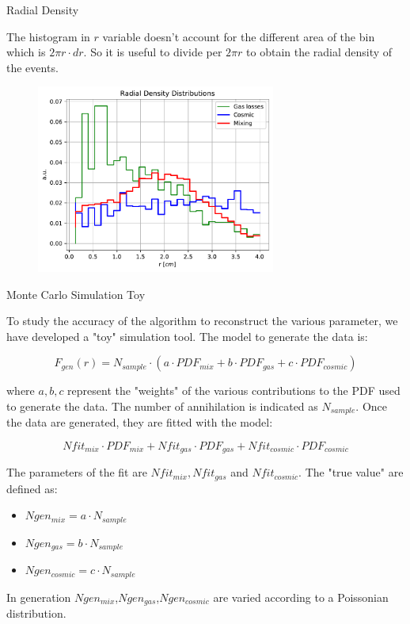 \documentclass[9pt]{beamer}
\newcommand{\disappear}[1]{} %
\begin{document}
\begin{frame}{Radial Density}

The histogram in $r$ variable doesn't account for the different area of the bin which is $2 \pi r \cdot dr$. So it is useful to divide per $2 \pi r$ to obtain the radial density of the events.

\begin{figure}[hbtp]
\centering
\includegraphics[width = 0.7\textwidth]{RadialDensity.pdf}
\disappear{\caption{Radial density for \texttt{r68465\_uw\_exp\_freq4.vertex} dataset}}
\end{figure}
\end{frame}

\begin{frame}[t]{Monte Carlo Simulation Toy}

To study the accuracy of the algorithm to reconstruct the various parameter, we have developed a "toy" simulation tool. The model to generate the data is:

\begin{equation}
F_{gen}(r) = N_{sample} \cdot (a \cdot PDF_{mix} + b \cdot PDF_{gas} + c \cdot PDF_{cosmic}) 
\end{equation}

where $a,b,c$ represent the "weights" of the various contributions to the PDF used to generate the data. The number of annihilation is indicated as $N_{sample}$. Once the data are generated, they are fitted with the model:

\begin{equation}
Nfit_{mix} \cdot PDF_{mix} + Nfit_{gas} \cdot PDF_{gas} + Nfit_{cosmic} \cdot PDF_{cosmic}
\end{equation}

The parameters of the fit are $Nfit_{mix}, Nfit_{gas}$ and $Nfit_{cosmic}$. The "true value" are defined as:

\begin{itemize}
\centering
\item $Ngen_{mix} = a \cdot N_{sample}$
\item $Ngen_{gas}  = b \cdot N_{sample}$
\item $Ngen_{cosmic}  = c \cdot N_{sample}$
\end{itemize} 

In generation $Ngen_{mix}$,$Ngen_{gas}$,$Ngen_{cosmic}$ are varied according to a Poissonian distribution. 
\end{frame}
\end{document}
